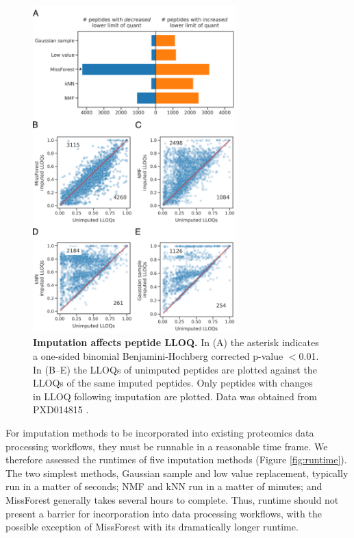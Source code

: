\documentclass{article}
\begin{document}
\begin{figure}
  \centering
  \includegraphics[width=0.7\textwidth]{figures/LLOQ-figure-multipanel-export4.png}
  \caption{{\bf Imputation affects peptide LLOQ.}  In (A) the asterisk indicates a one-sided binomial Benjamini-Hochberg corrected p-value $<$0.01. In (B--E) the LLOQs of unimputed peptides are plotted against the LLOQs of the same imputed peptides. Only peptides with changes in LLOQ following imputation are plotted. Data was obtained from PXD014815 \cite{matrix-matched-calib}.}
  \label{fig:lloq}
\end{figure}

For imputation methods to be incorporated into existing proteomics data processing workflows, they must be runnable in a reasonable time frame. We therefore assessed the runtimes of five imputation methods (Figure \ref{fig:runtime}). The two simplest methods, Gaussian sample and low value replacement, typically run in a matter of seconds; NMF and kNN run in a matter of minutes; and MissForest generally takes several hours to complete. Thus, runtime should not present a barrier for incorporation into data processing workflows, with the possible exception of MissForest with its dramatically longer runtime.
\end{document}
